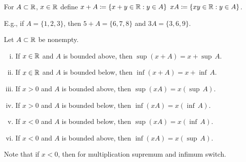\documentclass[10pt,aspectratio=169]{beamer}
\begin{document}
\begin{frame}
For $A \subset {\mathbb{R}}$, $x \in {\mathbb{R}}$ define
\quad $x + A  \coloneqq \{ x+y \in {\mathbb{R}} : y \in A \}$ \quad
$xA  \coloneqq \{ xy \in {\mathbb{R}} : y \in A \}$.

\medskip
\pause

E.g., if $A = \{ 1,2,3 \}$, then $5+A = \{ 6,7,8 \}$ and $3A = \{ 3,6,9
\}$.

\pause

\begin{proposition}
Let $A \subset {\mathbb{R}}$ be nonempty.
\begin{enumerate}[(i)]
\item If $x \in {\mathbb{R}}$ and $A$ is bounded above, then $\sup (x+A) = x + \sup\, A$.
\item \pause If $x \in {\mathbb{R}}$ and $A$ is bounded below, then $\inf (x+A) = x + \inf\, A$.
\item \pause If $x > 0$ and $A$ is bounded above, then $\sup (xA) = x ( \sup\, A )$.
\item \pause If $x > 0$ and $A$ is bounded below, then $\inf (xA) = x ( \inf\, A )$.
\item \pause If $x < 0$ and $A$ is bounded below, then $\sup (xA) = x ( \inf\, A )$.
\item \pause If $x < 0$ and $A$ is bounded above, then $\inf (xA) = x ( \sup\, A )$.
\end{enumerate}
\end{proposition}

\pause

Note that if $x < 0$, then for multiplication supremum and infimum switch.

\end{frame}
\end{document}
